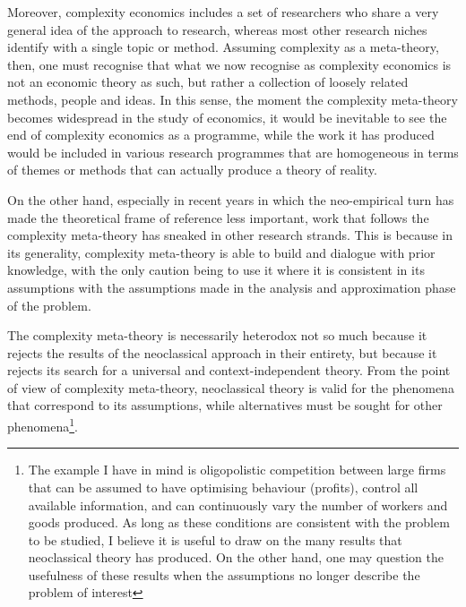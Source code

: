\documentclass[a4paper, headings=standardclasses]{scrartcl}
\begin{document}
Moreover, complexity economics includes a set of researchers who share a very general idea of the approach to research, whereas most other research niches identify with a single topic or method.
Assuming complexity as a meta-theory, then, one must recognise that what we now recognise as complexity economics is not an economic theory as such, but rather a collection of loosely related methods, people and ideas.
In this sense, the moment the complexity meta-theory becomes widespread in the study of economics, it would be inevitable to see the end of complexity economics as a programme, while the work it has produced would be included in various research programmes that are homogeneous in terms of themes or methods that can actually produce a theory of reality.

On the other hand, especially in recent years in which the neo-empirical turn has made the theoretical frame of reference less important, work that follows the complexity meta-theory has sneaked in other research strands.
This is because in its generality, complexity meta-theory is able to build and dialogue with prior knowledge, with the only caution being to use it where it is consistent in its assumptions with the assumptions made in the analysis and approximation phase of the problem.

The complexity meta-theory is necessarily heterodox not so much because it rejects the results of the neoclassical approach in their entirety, but because it rejects its search for a universal and context-independent theory.
From the point of view of complexity meta-theory, neoclassical theory is valid for the phenomena that correspond to its assumptions, while alternatives must be sought for other phenomena\footnote{The example I have in mind is oligopolistic competition between large firms that can be assumed to have optimising behaviour (profits), control all available information, and can continuously vary the number of workers and goods produced. As long as these conditions are consistent with the problem to be studied, I believe it is useful to draw on the many results that neoclassical theory has produced. On the other hand, one may question the usefulness of these results when the assumptions no longer describe the problem of interest}.
\end{document}
